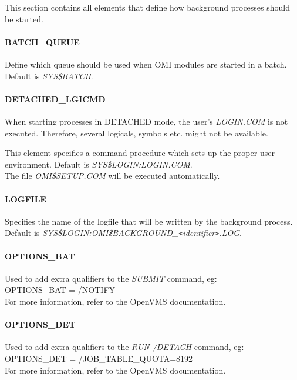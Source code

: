\documentclass[a4paper]{book}
\newcommand{\lt}{\texttt{<}}
\newcommand{\gt}{\texttt{>}}
\renewcommand{\indent}{\hspace*{5mm}}
\begin{document}
This section contains all elements that define how background processes 
should be started.

\paragraph{BATCH{\_}QUEUE}

Define which queue should be used when OMI modules are started in a batch. 
Default is \textsl{SYS{\$}BATCH}.

\paragraph{DETACHED{\_}LGICMD}

When starting processes in DETACHED mode, the user's \textsl{LOGIN.COM} is 
not executed. Therefore, several logicals, symbols etc. might not be 
available.

This element specifies a command procedure which sets up the proper user 
environment. Default is \textsl{SYS{\$}LOGIN:LOGIN.COM}. \\
The file \textsl{OMI{\$}SETUP.COM} will be executed automatically.

\paragraph{LOGFILE}

Specifies the name of the logfile that will be written by the background 
process. Default is 
\textsl{SYS{\$}LOGIN:OMI{\$}BACKGROUND{\_}\textit{\lt identifier\gt }.LOG}.

\paragraph{OPTIONS{\_}BAT}

Used to add extra qualifiers to the \textsl{SUBMIT} command, eg:\\
\indent\textsf{OPTIONS{\_}BAT = /NOTIFY} \\
For more information, refer to the OpenVMS documentation.

\paragraph{OPTIONS{\_}DET}

Used to add extra qualifiers to the \textsl{RUN /DETACH} command, eg:\\
\indent\textsf{OPTIONS{\_}DET = /JOB{\_}TABLE{\_}QUOTA=8192} \\
For more information, refer to the OpenVMS documentation.
\end{document}
